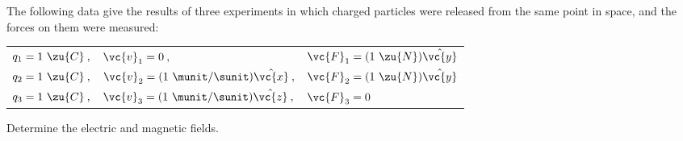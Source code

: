         The following data give the results of three experiments in which charged particles
        were released from the same point in space, and the forces on them were measured:

        \begin{tabular}{lll}
                $q_1=1\ \zu{C}\:,$ & $\vc{v}_1=0\:,$ & $\vc{F}_1=(1\ \zu{N})\hat{\vc{y}}$\\
                $q_2=1\ \zu{C}\:,$ & $\vc{v}_2=(1\ \munit/\sunit)\hat{\vc{x}}\:,$ & $\vc{F}_2=(1\ \zu{N})\hat{\vc{y}}$\\
                $q_3=1\ \zu{C}\:,$ & $\vc{v}_3=(1\ \munit/\sunit)\hat{\vc{z}}\:,$ & $\vc{F}_3=0$\\
        \end{tabular}

        \noindent Determine the electric and magnetic fields.\answercheck
